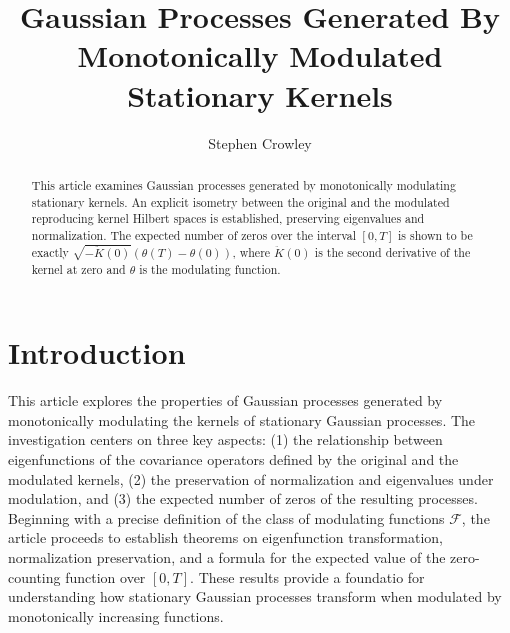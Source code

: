 \documentclass{mc}
\begin{document}

\title[Modulated Gaussian Processes]{Gaussian Processes Generated By Monotonically Modulated Stationary Kernels}

\author[Stephen Crowley]{Stephen Crowley\corrauth}

\begin{abstract}
This article examines Gaussian processes generated by monotonically modulating stationary kernels. An explicit isometry 
between the original and the modulated reproducing kernel Hilbert spaces is established, preserving eigenvalues and normalization. 
The expected number of zeros over the interval $[0,T]$ is shown to be exactly $\sqrt{-\ddot{K}(0)}(\theta(T)-\theta(0))$, 
where $\ddot{K}(0)$ is the second derivative of the kernel at zero and $\theta$ is the modulating function.
\end{abstract}



\maketitle

\section{Introduction}

This article explores the properties of Gaussian
processes\cite{correlationTheoryOfStationaryRandomProcesses}\cite{stationaryAndRelatedStochasticProcesses}
generated by
monotonically modulating the kernels of stationary Gaussian processes. The
investigation centers on three key aspects: (1) the relationship between
eigenfunctions of the covariance operators defined by the original and the modulated kernels, 
(2) the preservation of normalization and eigenvalues under modulation, and (3) 
the expected number of zeros of the resulting processes. Beginning with a 
precise definition of the class of modulating functions $\mathcal{F}$, the 
article proceeds to establish theorems on eigenfunction transformation, normalization
preservation, and a formula for the expected value of the zero-counting function over $[0,T]$. 
These results provide a foundatio for understanding how stationary Gaussian processes
transform when modulated by monotonically increasing functions.
\end{document}

